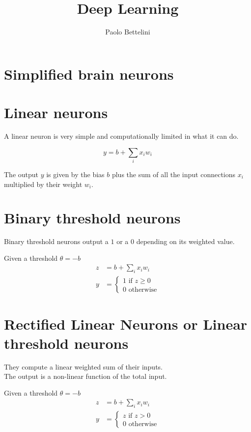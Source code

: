 \documentclass{article}
\title{Deep Learning}
\author{Paolo Bettelini}
\date{}
\begin{document}
\maketitle
\tableofcontents
\pagebreak

\section{Simplified brain neurons}

\section{Linear neurons}


A linear neuron is very simple and computationally limited in what it can do.

\[
    y=b+\sum_ix_iw_i
\]

The output \(y\) is given by the bias \(b\) plus the sum of all the input connections \(x_i\) multiplied by their weight \(w_i\).

\section{Binary threshold neurons}

Binary threshold neurons output a \(1\) or a \(0\) depending on its weighted value.

Given a threshold \(\theta=-b\)
\begin{align*}    
    z&=b+\sum_ix_iw_i \\
    y&=\begin{cases}
        1 \text{ if } z\ge 0 \\
        0 \text{ otherwise}
    \end{cases}
\end{align*}

\section{Rectified Linear Neurons or Linear threshold neurons}

They compute a linear weighted sum of their inputs. \\
The output is a non-linear function of the total input.

Given a threshold \(\theta=-b\)
\begin{align*}    
    z&=b+\sum_ix_iw_i \\
    y&=\begin{cases}
        z \text{ if } z > 0 \\
        0 \text{ otherwise}
    \end{cases}
\end{align*}
\end{document}
